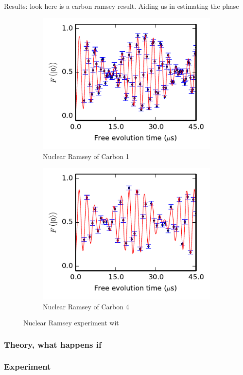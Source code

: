 Results: look here is a carbon ramsey result. Aiding us in estimating the phase
\begin{figure}[htbp]
    \begin{subfigure}[t]{0.49\textwidth}\centering
    \includegraphics{Img/CarbonRamsey_C1.pdf}
    \caption{Nuclear Ramsey of Carbon 1} \label{fig:CR_C1}
    \end{subfigure}
    \begin{subfigure}[t]{0.49\textwidth}\centering
        \includegraphics{Img/CarbonRamsey_C4.pdf}
        \caption{Nuclear Ramsey of Carbon 4}
        \label{fig:CR_C4}
    \end{subfigure}
    \caption{Nuclear Ramsey experiment wit}
\end{figure}


\subsubsection{Theory, what happens if }
\subsubsection{Experiment}



